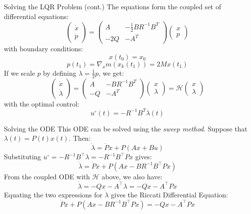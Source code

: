 \documentclass[10pt]{beamer}
\begin{document}
\begin{frame}[fragile]{Solving the LQR Problem (cont.)}
  The equations form the coupled set of differential equations:
  \[
  \begin{pmatrix}
  \dot{x} \\
  \dot{p}
  \end{pmatrix}
  =
  \begin{pmatrix}
  A & -\frac{1}{2} BR^{-1} B^T \\
  -2Q & -A^T
  \end{pmatrix}
  \begin{pmatrix}
  x \\
  p
  \end{pmatrix}
  \]
  with boundary conditions:
  \[
  x(t_0) = x_0
  \]
  \[
  p(t_1) = \nabla_x m(x_k(t_1)) = 2Mx(t_1)
  \]
  If we scale \( p \) by defining \( \lambda = \frac{1}{2} p \), we get:
  \[
  \begin{pmatrix}
  \dot{x} \\
  \dot{\lambda}
  \end{pmatrix}
  =
  \begin{pmatrix}
  A & -BR^{-1} B^T \\
  -Q & -A^T
  \end{pmatrix}
  \begin{pmatrix}
  x \\
  \lambda
  \end{pmatrix} = \mathcal{H}   \begin{pmatrix}
    x \\
    \lambda
    \end{pmatrix}
  \]
  with the optimal control:
  \[
  u^\circ(t) = -R^{-1} B^T \lambda(t)
  \]
\end{frame}

\begin{frame}[fragile]{Solving the ODE}
  This ODE can be solved using the \textit{sweep method}. Suppose that \( \lambda(t) = P(t)x(t) \). Then:
  \[
  \dot{\lambda} = \dot{P} x + P (Ax + Bu)
  \]
  Substituting \( u^\circ = -R^{-1} B^{\top} \lambda = -R^{-1} B^{\top} P x \) gives:
  \[
  \dot{\lambda} = \dot{P} x + P (Ax - BR^{-1} B^{\top} P x)
  \]
  From the coupled ODE with \(\mathcal{H}\) above, we also have:
  \[
  \dot{\lambda} = -Qx - A^{\top} \lambda = -Qx - A^{\top} P x
  \]
  Equating the two expressions for \( \dot{\lambda} \) gives the Riccati Differential Equation:
  \[
  \dot{P} x + P (Ax - BR^{-1} B^{\top} P x) = -Qx - A^{\top} P x
  \]
\end{frame}
\end{document}
